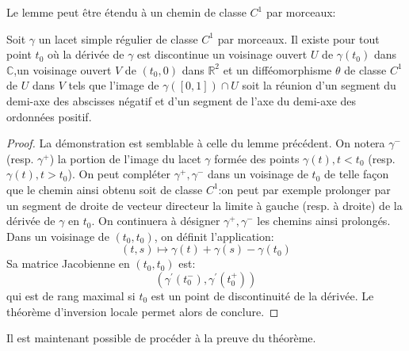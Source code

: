 Le lemme peut être étendu à un chemin de classe $C^1$ par morceaux:
\begin{lemme}
Soit $\gamma$ un lacet simple régulier de classe $C^1$ par morceaux. Il
existe pour tout point $t_0$ où la dérivée de $\gamma$ est discontinue un voisinage ouvert
$U$ de $\gamma(t_0)$ dans $\mathbb{C}$,un voisinage ouvert $V$ de $(t_0,0)$ dans
$\mathbb{R}^2$ et un difféomorphisme $\theta$ de classe $C^1$ de $U$ dans $V$
tels que l'image de $\gamma([0,1]) \cap U$ soit la réunion d'un segment du
demi-axe des abscisses négatif et d'un segment de l'axe du demi-axe des
ordonnées positif.
\end{lemme}
\begin{proof}
La démonstration est semblable à celle du lemme précédent. On notera $\gamma^-$
(resp. $\gamma^+$) la portion de l'image du lacet $\gamma$ formée des points
$\gamma(t), t < t_0$ (resp. $\gamma(t),t > t_0$). On peut compléter $\gamma^+,
\gamma^-$ dans un voisinage de $t_0$ de telle façon que le chemin ainsi obtenu
soit de classe $C^1$:on peut par exemple prolonger par un segment de droite de
vecteur directeur la limite à gauche (resp. à droite) de la dérivée de $\gamma$
en $t_0$. On continuera à désigner $\gamma^+, \gamma^-$ les chemins ainsi
prolongés. Dans un voisinage de $(t_0,t_0)$, on définit l'application:
\[
(t,s) \mapsto \gamma(t) + \gamma(s) - \gamma(t_0)
\]
Sa matrice Jacobienne en $(t_0,t_0)$ est:
\[
\left(
\gamma^\prime(t_0^-), \gamma^\prime(t_0^+) 
\right )
\]
qui est de rang maximal si $t_0$ est un point de discontinuité de la dérivée. 
Le théorème d'inversion locale permet alors de conclure.
\end{proof}
 Il est maintenant possible de procéder à la preuve du
théorème.
